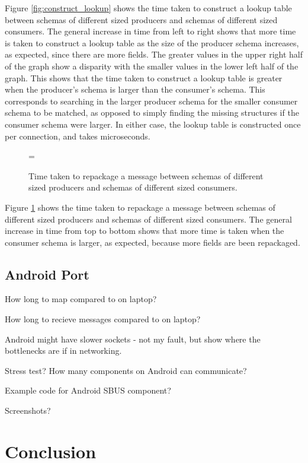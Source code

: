 \documentclass[12pt,twoside,notitlepage]{report}
\begin{document}
Figure \ref{fig:construct_lookup} shows the time taken to construct a lookup table between schemas of different sized producers and schemas of different sized consumers. 
The general increase in time from left to right shows that more time is taken to construct a lookup table as the size of the producer schema increases, as expected, since there are more fields. 
The greater values in the upper right half of the graph show a disparity with the smaller values in the lower left half of the graph. 
This shows that the time taken to construct a lookup table is greater when the producer's schema is larger than the consumer's schema. 
This corresponds to searching in the larger producer schema for the smaller consumer schema to be matched, as opposed to simply finding the missing structures if the consumer schema were larger.
In either case, the lookup table is constructed once per connection, and takes microseconds.

\begin{figure}[tbh]
\epsfxsize=\hsize
\centerline{}
\caption[Repackage Message]{Time taken to repackage a message between schemas of different sized producers and schemas of different sized consumers.}
\label{fig:repack_message}
\end{figure}

Figure \ref{fig:repack_message} shows the time taken to repackage a message between schemas of different sized producers and schemas of different sized consumers. 
The general increase in time from top to bottom shows that more time is taken when the consumer schema is larger, as expected, because more fields are been repackaged.

\section{Android Port}

How long to map compared to on laptop?

How long to recieve messages compared to on laptop?

Android might have slower sockets - not my fault, but show where the bottlenecks are if in networking.

Stress test? How many components on Android can communicate?

Example code for Android SBUS component?

Screenshots?

\cleardoublepage

\chapter{Conclusion}
\end{document}
